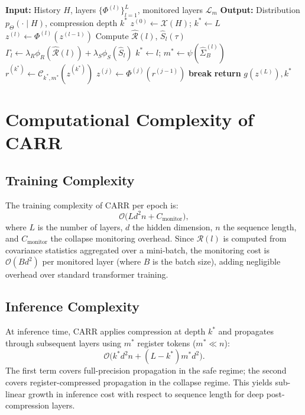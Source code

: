 \documentclass[lettersize,journal]{IEEEtran}
\begin{document}
\begin{algorithm}[t]
\caption{CARR Forward Pass}\label{alg:carr}
\begin{algorithmic}
\STATE \textbf{Input:} History $H$, layers $\{\Phi^{(l)}\}_{l=1}^L$, monitored layers $\mathcal{L}_m$
\STATE \textbf{Output:} Distribution $p_{\Theta}(\cdot \mid H)$, compression depth $k^*$
\STATE $z^{(0)} \gets \mathcal{X}(H)$; $k^* \gets L$
    \STATE $z^{(l)} \gets \Phi^{(l)}(z^{(l-1)})$
        \STATE Compute $\widehat{\mathcal{R}}(l)$, $\widehat{S}_l(\tau)$
        \STATE $\Gamma_l \gets \lambda_R \phi_R(\widehat{\mathcal{R}}(l)) + \lambda_S \phi_S(\widehat{S}_l)$
            \STATE $k^* \gets l$; $m^* \gets \psi(\widehat{\Sigma}_B^{(l)})$
            \STATE $r^{(k^*)} \gets \mathcal{C}_{k^*,m^*}(z^{(k^*)})$
                \STATE $z^{(j)} \gets \Phi^{(j)}(r^{(j-1)})$
            \ENDFOR
            \STATE \textbf{break}
        \ENDIF
    \ENDIF
\ENDFOR
\STATE \textbf{return} $g(z^{(L)}), k^*$
\end{algorithmic}
\end{algorithm}

\section{Computational Complexity of CARR}

\subsection{Training Complexity}
The training complexity of CARR per epoch is:
\begin{equation}
\mathcal{O}\bigl(L d^2 n + C_{\mathrm{monitor}}\bigr),
\end{equation}
where $L$ is the number of layers, $d$ the hidden dimension, $n$ the sequence length, and $C_{\mathrm{monitor}}$ the collapse monitoring overhead. Since $\mathcal{R}(l)$ is computed from covariance statistics aggregated over a mini-batch, the monitoring cost is $\mathcal{O}(B d^2)$ per monitored layer (where $B$ is the batch size), adding negligible overhead over standard transformer training.

\subsection{Inference Complexity}
At inference time, CARR applies compression at depth $k^*$ and propagates through subsequent layers using $m^*$ register tokens ($m^* \ll n$):
\begin{equation}
\mathcal{O}\bigl(k^* d^2 n + (L - k^*) m^* d^2\bigr).
\end{equation}
The first term covers full-precision propagation in the safe regime; the second covers register-compressed propagation in the collapse regime. This yields sub-linear growth in inference cost with respect to sequence length for deep post-compression layers.
\end{document}
